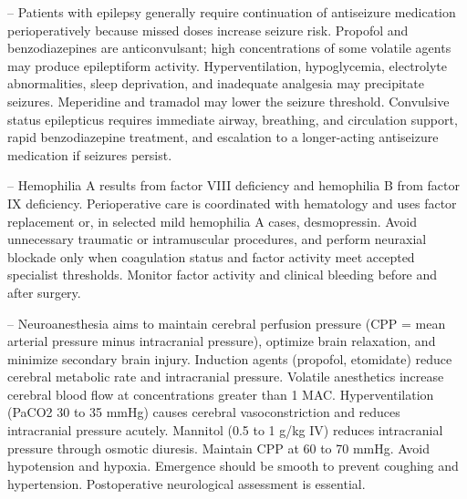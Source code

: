 -- Patients with epilepsy generally require continuation of antiseizure medication perioperatively because missed doses increase seizure risk. Propofol and benzodiazepines are anticonvulsant; high concentrations of some volatile agents may produce epileptiform activity. Hyperventilation, hypoglycemia, electrolyte abnormalities, sleep deprivation, and inadequate analgesia may precipitate seizures. Meperidine and tramadol may lower the seizure threshold. Convulsive status epilepticus requires immediate airway, breathing, and circulation support, rapid benzodiazepine treatment, and escalation to a longer-acting antiseizure medication if seizures persist.

-- Hemophilia A results from factor VIII deficiency and hemophilia B from factor IX deficiency. Perioperative care is coordinated with hematology and uses factor replacement or, in selected mild hemophilia A cases, desmopressin. Avoid unnecessary traumatic or intramuscular procedures, and perform neuraxial blockade only when coagulation status and factor activity meet accepted specialist thresholds. Monitor factor activity and clinical bleeding before and after surgery.

-- Neuroanesthesia aims to maintain cerebral perfusion pressure (CPP = mean arterial pressure minus intracranial pressure), optimize brain relaxation, and minimize secondary brain injury. Induction agents (propofol, etomidate) reduce cerebral metabolic rate and intracranial pressure. Volatile anesthetics increase cerebral blood flow at concentrations greater than 1 MAC. Hyperventilation (PaCO2 30 to 35 mmHg) causes cerebral vasoconstriction and reduces intracranial pressure acutely. Mannitol (0.5 to 1 g/kg IV) reduces intracranial pressure through osmotic diuresis. Maintain CPP at 60 to 70 mmHg. Avoid hypotension and hypoxia. Emergence should be smooth to prevent coughing and hypertension. Postoperative neurological assessment is essential.

